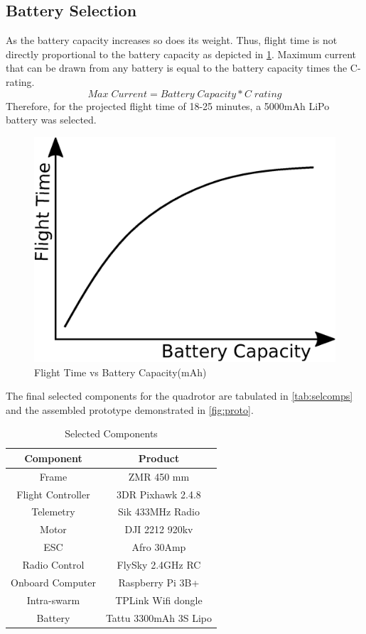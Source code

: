 \begin{spacing}{2}
\subsection{Battery Selection}
As the battery capacity increases so does its weight. Thus, flight time is not directly proportional to the battery capacity as depicted in \ref{fig:batcap}. Maximum current that can be drawn from any battery is equal to the battery capacity times the C- rating.
\begin{equation}
    Max\; Current = Battery\; Capacity * C\; rating
\end{equation}
Therefore, for the projected flight time of 18-25 minutes, a 5000mAh LiPo battery was selected.
\begin{figure}[h]
    \centering
    \includegraphics[width=0.7\linewidth]{image/batcap.eps}
    \caption{Flight Time vs Battery Capacity(mAh)}
    \label{fig:batcap}
\end{figure}

The final selected components for the quadrotor are tabulated in \ref{tab:selcomps} and the assembled prototype demonstrated in \ref{fig:proto}.

\begin{table}[h]
    \centering
    \caption{Selected Components}
    \begin{tabular}{c|c}
        \hline \textbf{Component} & \textbf{Product} \\\hline
        Frame & ZMR 450 mm \\
        Flight Controller & 3DR Pixhawk 2.4.8 \\
        Telemetry & Sik 433MHz Radio \\
        Motor & DJI 2212 920kv\\
        ESC & Afro 30Amp \\
        Radio Control & FlySky 2.4GHz RC \\
        Onboard Computer & Raspberry Pi 3B+ \\
        Intra-swarm & TPLink Wifi dongle \\
        Battery & Tattu 3300mAh 3S Lipo\\\hline
    \end{tabular}
    

\end{table}
\end{spacing}
